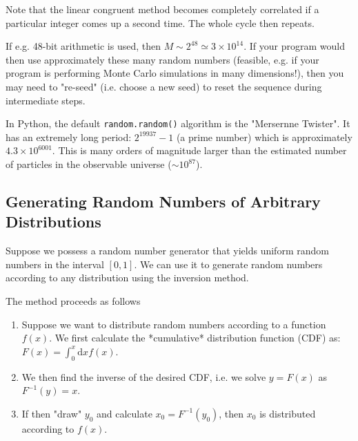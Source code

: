 \documentclass[../../../main.tex]{subfiles}
\begin{document}
Note that the linear congruent method becomes completely correlated if a particular integer comes up a second time.
The whole cycle then repeats.

If e.g. 48-bit arithmetic is used, then $M \sim 2^{48} \simeq 3\times 10^{14}$.
If your program would then use approximately these many random numbers (feasible, e.g. if your program is performing Monte Carlo simulations in many dimensions!), then you may need to "re-seed" (i.e. choose a new seed) to reset the sequence during intermediate steps.

In Python, the default \verb|random.random()| algorithm is the "Mersernne Twister".
It has an extremely long period: $2^{19937} -1$ (a prime number) which is approximately $4.3 \times 10^{6001}$.
This is many orders of magnitude larger than the estimated number of particles in the observable universe ($\sim 10^{87}$).

\subsection{Generating Random Numbers of Arbitrary Distributions}

Suppose we possess a random number generator that yields uniform random numbers in the interval $[0,1]$. We can use it to generate random numbers according to any distribution using the inversion method.

The method proceeds as follows
\begin{enumerate}
    \item Suppose we want to distribute random numbers according to a function $f(x)$. We first calculate the *cumulative* distribution function (CDF) as: $F(x) = \int^x_0 \mathrm{d}x f(x)$.
    \item We then find the inverse of the desired CDF, i.e. we solve $y=F(x)$ as $F^{-1}(y)=x$.
    \item If then "draw" $y_0$ and calculate $x_0 = F^{-1}(y_0)$, then $x_0$ is distributed according to $f(x)$.
\end{enumerate}
\end{document}
